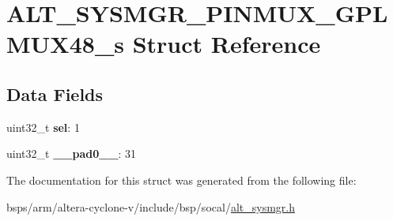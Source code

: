 \hypertarget{structALT__SYSMGR__PINMUX__GPLMUX48__s}{}\section{A\+L\+T\+\_\+\+S\+Y\+S\+M\+G\+R\+\_\+\+P\+I\+N\+M\+U\+X\+\_\+\+G\+P\+L\+M\+U\+X48\+\_\+s Struct Reference}
\label{structALT__SYSMGR__PINMUX__GPLMUX48__s}
\subsection*{Data Fields}
\begin{DoxyCompactItemize}
\item 
\mbox{\label{structALT__SYSMGR__PINMUX__GPLMUX48__s_a67005c3e2707073c47984c6b4fe8b31e}} 
uint32\+\_\+t {\bfseries sel}\+: 1
\item 
\mbox{\label{structALT__SYSMGR__PINMUX__GPLMUX48__s_a1fc5e55c9d2aae9f0c030e8d3dbf00ff}} 
uint32\+\_\+t {\bfseries \+\_\+\+\_\+pad0\+\_\+\+\_\+}\+: 31
\end{DoxyCompactItemize}


The documentation for this struct was generated from the following file\+:\begin{DoxyCompactItemize}
\item 
bsps/arm/altera-\/cyclone-\/v/include/bsp/socal/\mbox{\hyperlink{alt__sysmgr_8h}{alt\+\_\+sysmgr.\+h}}\end{DoxyCompactItemize}
